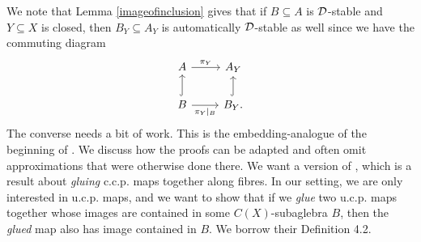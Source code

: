 \documentclass[12pt]{amsart}
\begin{document}
 

We note that Lemma \ref{imageofinclusion} gives that if $B\subseteq A$ is $\mathcal{D}$-stable and $Y \subseteq X$ is closed, then $B_Y \subseteq A_Y$ is automatically $\mathcal{D}$-stable as well since we have the commuting diagram
\begin{equation}
\begin{tikzcd}
A \arrow[r, "\pi_Y"]                     & A_Y                \\
B \arrow[u, hook] \arrow[r, "\pi_Y|_B"'] & B_Y. \arrow[u, hook]
\end{tikzcd}
\end{equation}
The converse needs a bit of work. This is the embedding-analogue of the beginning of \cite[Section 4]{HirshbergRordamWinter07}. We discuss how the proofs can be adapted and often omit approximations that were otherwise done there. We want a version of \cite[Lemma 4.5]{HirshbergRordamWinter07}, which is a result about \emph{gluing} c.c.p. maps together along fibres. In our setting, we are only interested in u.c.p. maps, and we want to show that if we \emph{glue} two u.c.p. maps together whose images are contained in some $C(X)$-subaglebra $B$, then the \emph{glued} map also has image contained in $B$. We borrow their Definition 4.2.
\end{document}
